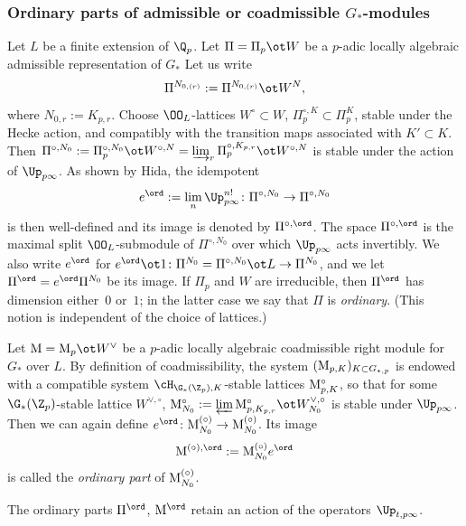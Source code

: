 \subsubsection{Ordinary parts of admissible or coadmissible $G_{*}$-modules}  
Let $L$ be a finite extension of $\Q_{p}$. Let $\Pi=\Pi_{p}\ot W$ be a $p$-adic locally algebraic admissible representation of $G_{*}$
 Let us write
$$\Pi^{N_{0, (r)}}:= \Pi^{N_{0, (r)}}\ot W^{N} ,$$ where $N_{0, r}:=K_{p, r}$. Choose  $\OO_{L}$-lattices $W^{\circ}\subset W$, $\Pi_{p}^{\circ, K}\subset \Pi_{p}^{K}$, stable under the Hecke action, and compatibly with    the transition maps associated with  $K'\subset K$.
 Then   $\Pi^{\circ, N_{0}}:=\Pi_{p}^{\circ, N_{0}} \ot W^{\circ, N}= \varinjlim_{r} \Pi_{p}^{\circ, K_{p,r}} \ot W^{\circ, N}$
is  stable under the action of $\Up_{p\infty}$.
As shown by Hida, the idempotent
 $$e^{\ord}: = \lim_{n}\Up_{p\infty}^{n!} \colon \Pi^{\circ, N_{0}}\to \Pi^{\circ, N_{0}}$$ is then well-defined and its image is denoted by $\Pi^{\circ, \ord}$.  The space $\Pi^{\circ, \ord}$ is   the maximal split $\OO_{L}$-submodule of $\Pi^{\circ, N_{0}}$ over which $\Up_{p\infty}$ acts invertibly. We also write $e^{\ord}$ for $e^{\ord}\ot 1\colon \Pi^{N_{0}}=\Pi^{\circ, N_{0}}\ot L\to \Pi^{N_{0}}$, and we let $\Pi^{\ord}=e^{\ord}\Pi^{N_{0}}$ be its image. If $\Pi_{p}$ and $W$ are irreducible, then $\Pi^{\ord}$ has dimension either~$0$ or~$1$; in the latter case we say that $\Pi$ is \emph{ordinary}.  (This notion is independent of the choice of lattices.)

 Let ${\rm M}={\rm M}_{p}\ot W^{\vee}$ be a $p$-adic locally algebraic coadmissible  right module for $G_{*}$ over $L$. By definition of coadmissibility, the system $({\rm M}_{p,K})_{K\subset G_{*,p}}$ is endowed with a compatible system $\cH_{\G_{*}(\Z_{p}), K}$-stable  lattices ${\rm M}_{p,K}^{\circ}$, so that  for some $\G_{*}(\Z_{p})$-stable lattice $W^{\vee, \circ}$,
 ${\rm M}^{\circ}_{N_{0}}:= \varprojlim {\rm M}^{\circ}_{p, K_{p, r}}\ot W^{\vee, \circ}_{N_{0}}$
is  stable under $\Up_{p\infty}$. Then we can again define $e^{\ord}\colon {\rm M}^{(\circ)}_{N_{0}} \to {\rm M}^{(\circ)}_{N_{0}}$. Its image
$${\rm M}^{(\circ), \ord}:= {\rm M}^{(\circ)}_{N_{0}} e^{\ord}$$ is called the \emph{ordinary part} of ${\rm M}^{(\circ)}_{N_{0}} $.

The ordinary parts $\Pi^{\ord}$, ${\rm M}^{\ord}$ retain an action of the operators $\Up_{t, p\infty}$.




